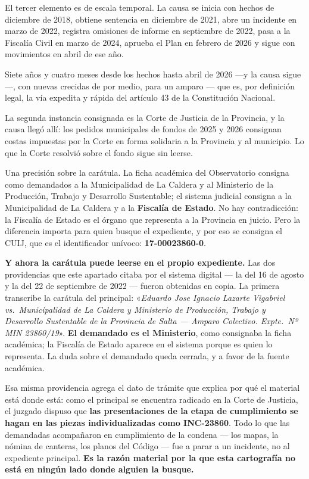 \begin{cautela}
El tercer elemento es de escala temporal. La causa se inicia con hechos de diciembre de 2018, obtiene sentencia en diciembre de 2021, abre un incidente en marzo de 2022, registra omisiones de informe en septiembre de 2022, pasa a la Fiscalía Civil en marzo de 2024, aprueba el Plan en febrero de 2026 y sigue con movimientos en abril de ese año.

Siete años y cuatro meses desde los hechos hasta abril de 2026 ---y la causa sigue---, con nuevas crecidas de por medio, para un amparo --- que es, por definición legal, la vía expedita y rápida del artículo 43 de la Constitución Nacional.

La segunda instancia consignada es la Corte de Justicia de la Provincia, y la causa llegó allí: los pedidos municipales de fondos de 2025 y 2026 consignan costas impuestas por la Corte en forma solidaria a la Provincia y al municipio. Lo que la Corte resolvió sobre el fondo sigue sin leerse.
\end{cautela}

Una precisión sobre la carátula. La ficha académica del Observatorio consigna como demandados a la Municipalidad de La Caldera y al Ministerio de la Producción, Trabajo y Desarrollo Sustentable; el sistema judicial consigna a la Municipalidad de La Caldera y a la \textbf{Fiscalía de Estado}. No hay contradicción: la Fiscalía de Estado es el órgano que representa a la Provincia en juicio. Pero la diferencia importa para quien busque el expediente, y por eso se consigna el CUIJ, que es el identificador unívoco: \textbf{17-00023860-0}.

\textbf{Y ahora la carátula puede leerse en el propio expediente.} Las dos providencias que este apartado citaba por el sistema digital --- la del 16 de agosto y la del 22 de septiembre de 2022 --- fueron obtenidas en copia. La primera transcribe la carátula del principal: «\textit{Eduardo Jose Ignacio Lazarte Vigabriel vs.\ Municipalidad de La Caldera y Ministerio de Producción, Trabajo y Desarrollo Sustentable de la Provincia de Salta --- Amparo Colectivo. Expte.\ Nº MIN 23860/19}». \textbf{El demandado es el Ministerio}, como consignaba la ficha académica; la Fiscalía de Estado aparece en el sistema porque es quien lo representa. La duda sobre el demandado queda cerrada, y a favor de la fuente académica.

Esa misma providencia agrega el dato de trámite que explica por qué el material está donde está: como el principal se encuentra radicado en la Corte de Justicia, el juzgado dispuso que \textbf{las presentaciones de la etapa de cumplimiento se hagan en las piezas individualizadas como INC-23860}. Todo lo que las demandadas acompañaron en cumplimiento de la condena --- los mapas, la nómina de canteras, los planos del Código --- fue a parar a un incidente, no al expediente principal. \textbf{Es la razón material por la que esta cartografía no está en ningún lado donde alguien la busque.}

